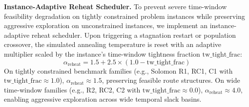 \documentclass[journal]{IEEEtran}
\begin{document}
\textbf{Instance-Adaptive Reheat Scheduler.}
To prevent severe time-window feasibility degradation on tightly constrained problem instances while preserving aggressive exploration on unconstrained instances, we implement an instance-adaptive reheat scheduler. Upon triggering a stagnation restart or population crossover, the simulated annealing temperature is reset with an adaptive multiplier scaled by the instance's time-window tightness fraction $\text{tw\_tight\_frac}$:
\begin{equation}
  \alpha_{\text{reheat}} = 1.5 + 2.5 \times (1.0 - \text{tw\_tight\_frac})
  \label{eq:reheat_mult}
\end{equation}
On tightly constrained benchmark families (e.g., Solomon R1, RC1, C1 with $\text{tw\_tight\_frac} \approx 1.0$), $\alpha_{\text{reheat}} \approx 1.5$, preserving feasible route structures. On wide time-window families (e.g., R2, RC2, C2 with $\text{tw\_tight\_frac} \approx 0.0$), $\alpha_{\text{reheat}} \approx 4.0$, enabling aggressive exploration across wide temporal slack basins.
\end{document}
